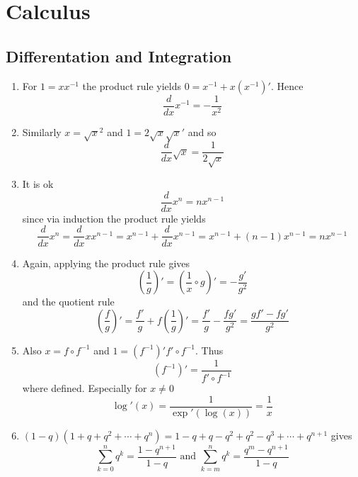 
\newpage
\section{Calculus}

\subsection{Differentation and Integration}
\bigskip


\begin{lemma}\hfill
    \begin{enumerate}
        \item For \( 1 = x x^{-1} \) the product rule yields \( 0 = x^{-1} + x(x^{-1})' \). Hence
              \[
                  \frac{d}{dx} x^{-1} = -\frac{1}{x^2}
              \]
        \item Similarly \( x = \sqrt{x}^2 \) and \( 1 = 2 \sqrt{x} \sqrt{x}' \) and so
              \[
                  \frac{d}{dx} \sqrt{x} = \frac{1}{2\sqrt{x}}
              \]
        \item It is ok
              \[
                  \frac{d}{dx} x^n = nx^{n - 1}
              \]
              since via induction the product rule yields
              \[
                  \frac{d}{dx} x^n = \frac{d}{dx} xx^{n -1} = x^{n -1} + \frac{d}{dx} x^{n - 1} =
                  x^{n -1} + (n - 1)x^{n - 1}  = nx^{n - 1}
              \]
        \item Again, applying the product rule gives
              \[
                  \left(\frac{1}{g}\right)' = \left(\frac{1}{x} \circ g\right)' = -\frac{g'}{g^2}
              \]
              and the quotient rule
              \[
                  \left(\frac{f}{g}\right)' = \frac{f'}{g} + f \left(\frac{1}{g} \right)' =
                  \frac{f'}{g} -\frac{fg'}{g^2} = \frac{gf'- fg'}{g^2}
              \]
        \item Also \( x = f \circ f^{-1} \) and \( 1 = (f^{-1})'f' \circ f^{-1} \). Thus
              \[
                  (f^{-1})' = \frac{1}{f' \circ f^{-1}}
              \]
              where defined. Especially for \( x \ne 0 \)
              \[
                  \log'(x) = \frac{1}{\exp'(\log(x))} = \frac{1}{x}
              \]

        \item \( (1 - q) (1 + q + q^2 + \cdots + q^n) = 1 - q + q - q^2 + q^2 - q^3 + \cdots + q^{n+1} \) gives
              \[
                  \sum_{k=0}^n q^k = \frac{1 - q^{n+1}}{1 - q} \text{ and }
                  \sum_{k=m}^n q^k = \frac{q^m - q^{n+1}}{1 - q}
              \]
    \end{enumerate}
\end{lemma}
\bigskip

